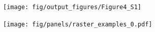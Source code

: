 \documentclass[a4paper,12pt]{article}
\newcommand{\ssc}[3]{\ensuremath{#1_{\text{#2}_{\text{#3}}}}}
\newcommand{\gE      }{\ssc{g}      {\scriptsize{E}}{}}
\newcommand{\gI      }{\ssc{g}      {\scriptsize{I}}{}}
\begin{document}
{\begin{figure}[ht!]
    \internallinenumbers
    \centering
        \texttt{[image: fig/output\_figures/Figure4\_S1]}
    \caption{}
\end{figure}

\clearpage


%
%
%

\begin{figure}[p]
    \centering
        \texttt{[image: fig/panels/raster\_examples\_0.pdf]}
\end{figure}

}
\end{document}
